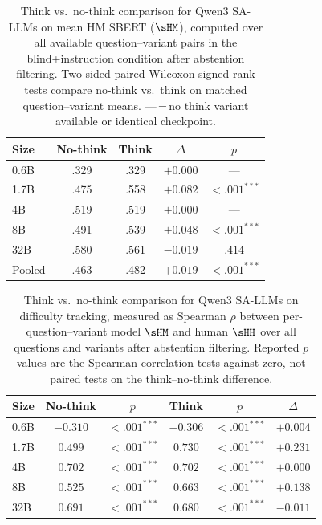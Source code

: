\begin{table}[h]
\centering
\small
\setlength{\tabcolsep}{4pt}

\begin{tabular}{lcccc}
\toprule
\textbf{Size} & \textbf{No-think} & \textbf{Think} & \textbf{$\Delta$} & \textbf{$p$} \\
\midrule
0.6B  & .329 & .329 & $+0.000$ & {---} \\
1.7B  & .475 & .558 & $+0.082$ & $<.001^{***}$ \\
4B    & .519 & .519 & $+0.000$ & {---} \\
8B    & .491 & .539 & $+0.048$ & $<.001^{***}$ \\
32B   & .580 & .561 & $-0.019$ & $.414$ \\
\midrule
Pooled & .463 & .482 & $+0.019$ & $<.001^{***}$ \\
\bottomrule
\end{tabular}
\caption{Think vs.\ no-think comparison for Qwen3 SA-LLMs on mean HM SBERT ($\sHM$), computed over all available question--variant pairs in the blind+instruction condition after abstention filtering. Two-sided paired Wilcoxon signed-rank tests compare no-think vs.\ think on matched question--variant means. {---}\,=\,no think variant available or identical checkpoint.}
\label{tab:thinking_shm_wilcoxon}
\end{table}

\begin{table}[h]
\centering
\small
\setlength{\tabcolsep}{4pt}
\caption{Think vs.\ no-think comparison for Qwen3 SA-LLMs on difficulty tracking, measured as Spearman $\rho$ between per-question--variant model $\sHM$ and human $\sHH$ over all questions and variants after abstention filtering. Reported $p$ values are the Spearman correlation tests against zero, not paired tests on the think--no-think difference.}
\label{tab:thinking_spearman}
\begin{tabular}{lccccc}
\toprule
\textbf{Size} & \textbf{No-think} & \textbf{$p$} & \textbf{Think} & \textbf{$p$} & \textbf{$\Delta$} \\
\midrule
0.6B  & $-0.310$ & $<.001^{***}$ & $-0.306$ & $<.001^{***}$ & $+0.004$ \\
1.7B  & $0.499$ & $<.001^{***}$ & $0.730$ & $<.001^{***}$ & $+0.231$ \\
4B    & $0.702$ & $<.001^{***}$ & $0.702$ & $<.001^{***}$ & $+0.000$ \\
8B    & $0.525$ & $<.001^{***}$ & $0.663$ & $<.001^{***}$ & $+0.138$ \\
32B   & $0.691$ & $<.001^{***}$ & $0.680$ & $<.001^{***}$ & $-0.011$ \\
\bottomrule
\end{tabular}
\end{table}
